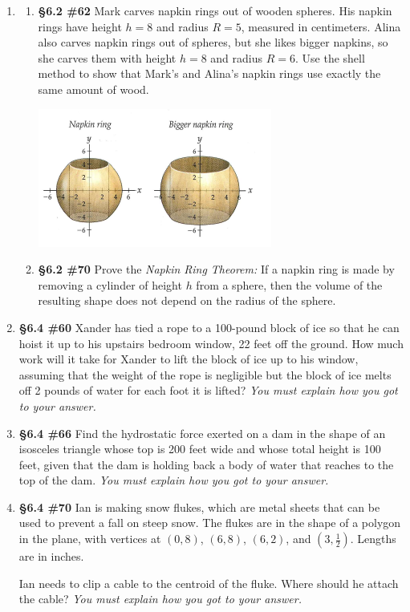 \documentclass[%
]{article}
\begin{document}
\begin{enumerate}
\item \begin{enumerate}
	\item {\bf \S6.2 \#62} Mark carves napkin rings out of wooden spheres.  His napkin rings have height $h=8$ and radius $R=5$, measured in centimeters.  Alina also carves napkin rings out of spheres, but she likes bigger napkins, so she carves them with height $h=8$ and radius $R=6$.  Use the shell method to show that Mark's and Alina's napkin rings use exactly the same amount of wood.
\vspace{-0.5pc}
\begin{center}
\includegraphics[scale=1]{6-2_62TaalmanKohn}
\end{center}
	\item {\bf \S6.2 \#70} Prove the \emph{Napkin Ring Theorem:} If a napkin ring is made by removing a cylinder of height $h$ from a sphere, then the volume of the resulting shape does not depend on the radius of the sphere.
	\end{enumerate}

\item {\bf \S6.4 \#60} Xander has tied a rope to a 100-pound block of ice so that he can hoist it up to his upstairs bedroom window, 22 feet off the ground.  How much work will it take for Xander to lift the block of ice up to his window, assuming that the weight of the rope is negligible but the block of ice melts off 2 pounds of water for each foot it is lifted?  \textit{You must explain how you got to your answer.}

\item {\bf \S6.4 \#66} Find the hydrostatic force exerted on a dam in the shape of an isosceles triangle whose top is 200 feet wide and whose total height is 100 feet, given that the dam is holding back a body of water that reaches to the top of the dam.  \textit{You must explain how you got to your answer.}

\item {\bf \S6.4 \#70} Ian is making snow flukes, which are metal sheets that can be used to prevent a fall on steep snow.  The flukes are in the shape of a polygon in the plane, with vertices at $(0,8)$, $(6,8)$, $(6,2)$, and $(3,\frac{1}{2})$. Lengths are in inches.

Ian needs to clip a cable to the centroid of the fluke.  Where should he attach the cable?  \textit{You must explain how you got to your answer.}

\end{enumerate}
\end{document}
